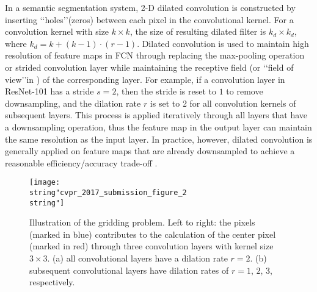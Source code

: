 \documentclass[10pt,twocolumn,letterpaper]{article}
\begin{document}
In a semantic segmentation system, 2-D dilated convolution is constructed by inserting \lq\lq holes\rq\rq (zeros) between each pixel in the convolutional kernel. For a convolution kernel with size $k\times{k}$, the size of resulting dilated filter is $k_d\times{k_d}$, where $k_d=k+(k-1)\cdot(r-1)$. Dilated convolution is used to maintain high resolution of feature maps in FCN through replacing the max-pooling operation or strided convolution layer while maintaining the receptive field (or \lq\lq field of view\rq\rq in \cite{chen2016deeplab}) of the corresponding layer. For example, if a convolution layer in ResNet-101 has a stride $s=2$, then the stride is reset to $1$ to remove downsampling, and the dilation rate $r$ is set to 2 for all convolution kernels of subsequent layers. This process is applied iteratively through all layers that have a downsampling operation, thus the feature map in the output layer can maintain the same resolution as the input layer. In practice, however, dilated convolution is generally applied on feature maps that are already downsampled to achieve a reasonable efficiency/accuracy trade-off \cite{chen2016deeplab}.

\begin{figure}[tp]
\begin{center}
\texttt{[image: \\string"cvpr\_2017\_submission\_figure\_2\\string"]}
\end{center}
\caption{Illustration of the gridding problem. Left to right: the pixels (marked in blue) contributes to the calculation of the center pixel (marked in red) through three convolution layers with kernel size $3\times 3$. (a) all convolutional layers have a dilation rate $r=2$. (b) subsequent convolutional layers have dilation rates of $r=1$, $2$, $3$, respectively.}
\vspace{-15pt}
\label{Figure2_gridding}
\end{figure}
\end{document}
